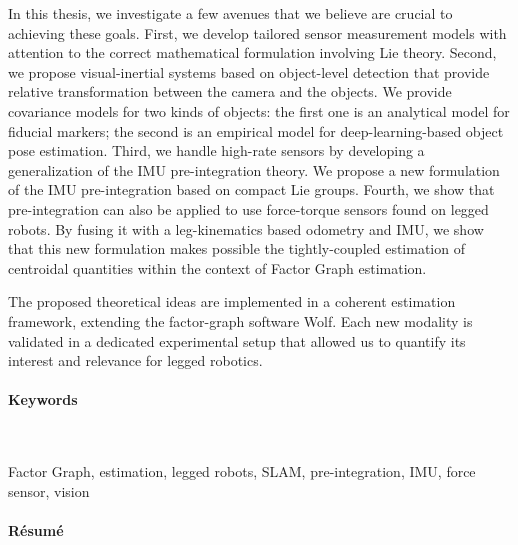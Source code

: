 In this thesis, we investigate a few avenues that we believe are crucial to achieving these goals. First, we develop tailored sensor measurement models 
with attention to the correct mathematical formulation involving Lie theory.
Second, we propose visual-inertial systems based on object-level detection that provide relative transformation between the camera and the objects.
We provide covariance models for two kinds of objects: the first one is an analytical model for fiducial markers; the second
is an empirical model for deep-learning-based object pose estimation.
Third, we handle high-rate sensors by developing a generalization of the IMU pre-integration theory. We propose a new formulation of the IMU
pre-integration based on compact Lie groups. 
Fourth, we show that pre-integration can also be applied to use force-torque sensors found on legged robots. 
By fusing it with a leg-kinematics based odometry and IMU, we show that this new formulation makes possible the tightly-coupled estimation
of centroidal quantities within the context of Factor Graph estimation.

The proposed theoretical ideas are implemented in a coherent estimation framework, extending the factor-graph software Wolf. Each new modality is 
validated in a dedicated experimental setup that allowed us to quantify its interest and relevance for legged robotics.



\paragraph{Keywords}~

Factor Graph, estimation, legged robots, SLAM, pre-integration, IMU, force sensor, vision 

\noindent\makebox[\linewidth]{\rule{0.6\textwidth}{2pt}}



\newpage


\noindent\makebox[\linewidth]{\rule{0.6\textwidth}{2pt}}


\paragraph{Résumé}~

